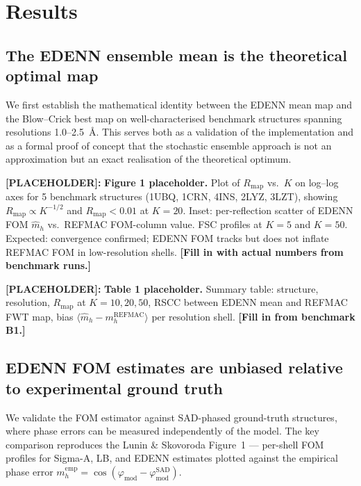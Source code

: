 \documentclass[10pt,twocolumn]{article}
\newcommand{\placeholder}[1]{%
  \begin{mdframed}[
    linecolor=placeholder,linewidth=1pt,
    backgroundcolor=red!5,
    innertopmargin=6pt,innerbottommargin=6pt,
    innerleftmargin=8pt,innerrightmargin=8pt]
  \small\color{placeholder}\textbf{[PLACEHOLDER]:} #1
  \end{mdframed}
}
\newcommand{\phimod}{\varphi_{\mathrm{mod}}}
\begin{document}
\section{Results}

\subsection{The EDENN ensemble mean is the theoretical optimal map}

We first establish the mathematical identity between the EDENN mean
map and the Blow--Crick best map on well-characterised benchmark
structures spanning resolutions 1.0--2.5~\AA.
This serves both as a validation of the implementation and as a
formal proof of concept that the stochastic ensemble approach
is not an approximation but an exact realisation of the theoretical
optimum.

\placeholder{
\textbf{Figure 1 placeholder.}
Plot of $R_{\mathrm{map}}$ vs.\ $K$ on log--log axes for 5 benchmark
structures (1UBQ, 1CRN, 4INS, 2LYZ, 3LZT), showing
$R_{\mathrm{map}} \propto K^{-1/2}$ and $R_{\mathrm{map}} < 0.01$
at $K=20$.
Inset: per-reflection scatter of EDENN FOM $\hat m_h$ vs.\
REFMAC FOM-column value.
FSC profiles at $K=5$ and $K=50$.
Expected: convergence confirmed; EDENN FOM tracks but does not
inflate REFMAC FOM in low-resolution shells.
\textbf{[Fill in with actual numbers from benchmark runs.]}
}

\placeholder{
\textbf{Table 1 placeholder.}
Summary table: structure, resolution, $R_{\mathrm{map}}$ at
$K=10,20,50$, RSCC between EDENN mean and REFMAC FWT map,
bias $\langle\hat m_h - m_h^{\mathrm{REFMAC}}\rangle$ per
resolution shell.
\textbf{[Fill in from benchmark B1.]}
}

\subsection{EDENN FOM estimates are unbiased relative to
experimental ground truth}

We validate the FOM estimator against SAD-phased ground-truth
structures, where phase errors can be measured independently
of the model.
The key comparison reproduces the Lunin \& Skovoroda Figure~1
— per-shell FOM profiles for Sigma-A, LB, and EDENN estimates
plotted against the empirical phase error $m_h^{\mathrm{emp}} =
\cos(\phimod - \phimod^{\mathrm{SAD}})$.
\end{document}
